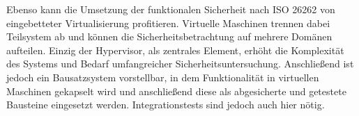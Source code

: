 \documentclass[
  a4paper,					    %
  twoside,
  DIV=calc,     				%
  bibliography=totoc,
  cleardoublepage=empty,
  ngerman,     					%
  final       					%
]{scrbook}
\begin{document}
%
%

Ebenso kann die Umsetzung der funktionalen Sicherheit nach ISO 26262 von eingebetteter Virtualisierung profitieren. Virtuelle Maschinen trennen dabei Teilsystem ab und können die Sicherheitsbetrachtung auf mehrere Domänen aufteilen. Einzig der Hypervisor, als zentrales Element, erhöht die Komplexität des Systems und Bedarf umfangreicher Sicherheitsuntersuchung. Anschließend ist jedoch ein Bausatzsystem vorstellbar, in dem Funktionalität in virtuellen Maschinen gekapselt wird und anschließend diese als abgesicherte und getestete Bausteine eingesetzt werden. Integrationstests sind jedoch auch hier nötig.
\end{document}
